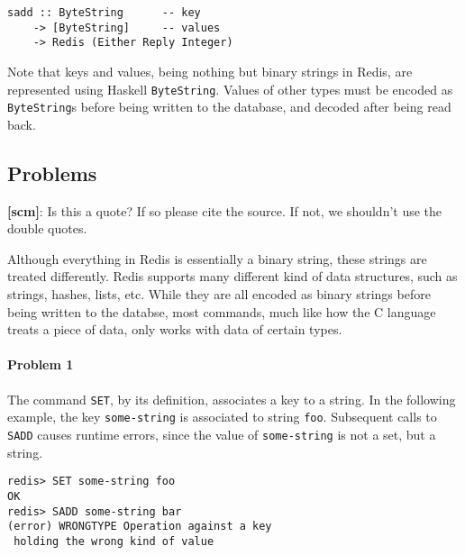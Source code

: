 \documentclass[pldi]{sigplanconf-pldi16}
\newcommand{\todo}[2]{{\bf [#1]}: #2}
\begin{document}
\begin{verbatim}
sadd :: ByteString      -- key
    -> [ByteString]     -- values
    -> Redis (Either Reply Integer)
\end{verbatim}

Note that keys and values, being nothing but binary strings in Redis,
are represented using Haskell \texttt{ByteString}.
Values of other types must be encoded as \texttt{ByteString}s before being written to the database,
and decoded after being read back.


\subsection{Problems}


\todo{scm}{Is this a quote? If so please cite the source. If not,
we shouldn't use the double quotes.}

Although everything in Redis is essentially a binary string, these strings are treated differently. Redis supports many different
kind of data structures, such as strings, hashes, lists, etc. While
they are all encoded as binary strings before being written to the databse, most commands, much like how the C language treats a piece of data, only works with data of certain types.

\paragraph{Problem 1} The command \texttt{SET}, by
its definition, associates a key to a string. In the following
example, the key \texttt{some-string} is associated
to string \texttt{foo}. Subsequent calls to
\texttt{SADD} causes runtime errors, since the value
of \texttt{some-string} is not a set, but a string.

\begin{verbatim}
redis> SET some-string foo
OK
redis> SADD some-string bar
(error) WRONGTYPE Operation against a key
 holding the wrong kind of value
\end{verbatim}
\end{document}
